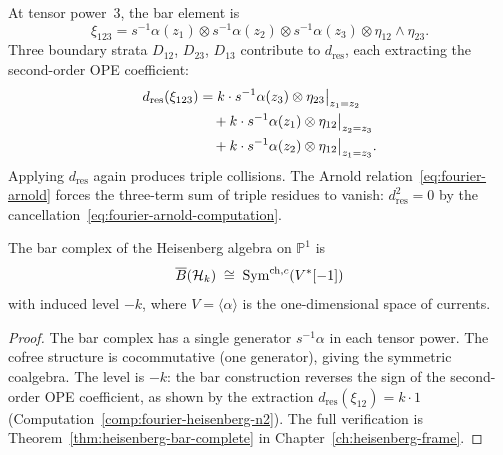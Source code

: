 \begin{computation}[\texorpdfstring{$n = 3$}{n = 3}; \ClaimStatusProvedHere]
\label{comp:fourier-heisenberg-n3}
At tensor power~$3$, the bar element is
\[
\xi_{123} = s^{-1}\alpha(z_1) \otimes s^{-1}\alpha(z_2)
  \otimes s^{-1}\alpha(z_3)
  \otimes \eta_{12} \wedge \eta_{23}.
\]
Three boundary strata $D_{12}$, $D_{23}$, $D_{13}$ contribute to
$d_{\mathrm{res}}$, each extracting the second-order OPE coefficient:
\begin{align}
d_{\mathrm{res}}(\xi_{123})
&= k \cdot s^{-1}\alpha(z_3) \otimes
  \eta_{23}\big|_{z_1 = z_2}
\notag \\
&\quad + k \cdot s^{-1}\alpha(z_1) \otimes
  \eta_{12}\big|_{z_2 = z_3}
\notag \\
&\quad + k \cdot s^{-1}\alpha(z_2) \otimes
  \eta_{12}\big|_{z_1 = z_3}.
\label{eq:fourier-dres-n3}
\end{align}
Applying $d_{\mathrm{res}}$ again produces triple collisions.
The Arnold relation~\eqref{eq:fourier-arnold} forces the three-term
sum of triple residues to vanish:
$d_{\mathrm{res}}^2 = 0$ by the
cancellation~\eqref{eq:fourier-arnold-computation}.
\end{computation}

\begin{theorem}[\ClaimStatusProvedHere]
\label{thm:fourier-heisenberg-bar}
The bar complex of the Heisenberg algebra on $\mathbb{P}^1$ is
\begin{equation}\label{eq:fourier-heisenberg-bar}
\overline{B}(\mathcal{H}_k) \;\cong\;
\operatorname{Sym}^{\mathrm{ch},c}(V^*[-1])
\end{equation}
with induced level $-k$, where $V = \langle\alpha\rangle$ is the
one-dimensional space of currents.
\end{theorem}

\begin{proof}
The bar complex has a single generator $s^{-1}\alpha$ in each tensor
power.  The cofree structure is cocommutative (one generator), giving
the symmetric coalgebra.  The level is $-k$: the bar construction
reverses the sign of the second-order OPE coefficient, as shown by the
extraction $d_{\mathrm{res}}(\xi_{12}) = k \cdot 1$
(Computation~\ref{comp:fourier-heisenberg-n2}).  The full verification
is Theorem~\ref{thm:heisenberg-bar-complete}
in Chapter~\ref{ch:heisenberg-frame}.
\end{proof}

